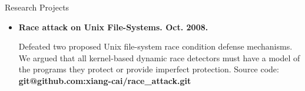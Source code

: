 \documentclass[11pt,oneside]{article}
\newenvironment{ressection}[1]{
	\vspace{4pt}
	{\fontfamily{phv}\selectfont\Large#1}
	\begin{itemize}
	\vspace{3pt}
}{
	\end{itemize}
}
\newcommand{\resitem}[1]{
	\vspace{-4pt}
	\item \begin{flushleft} #1 \end{flushleft}
}
\newcommand{\resbigitem}[3]{
	\vspace{-5pt}
	\item
	\textbf{#1} --- #2 \\
	\textit{#3}
}
\newenvironment{ressubsec}[3]{
	\resbigitem{#1}{#2}{#3}
	\vspace{-2pt}
	\begin{itemize}
}{
	\end{itemize}
}
\begin{document}
\begin{ressection}{Research Projects}
	\resitem{\textbf{Race attack on Unix File-Systems. Oct. 2008.}
		\begin{small}
		
		Defeated two proposed Unix file-system race
			condition defense mechanisms. We argued that all
			kernel-based dynamic race detectors must have a model of
			the programs they protect or provide imperfect
			protection. Source code: \textbf{git@github.com:xiang-cai/race\_attack.git}
		\end{small}
	} 


%
%
%					
%			



\end{ressection}
\end{document}
